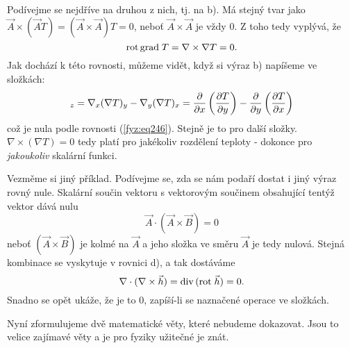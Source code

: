 {    Podívejme se nejdříve na druhou z nich, tj. na b). Má stejný tvar jako 
    $\vec{A}\times(\vec{A}T)= (\vec{A}\times\vec{A})T = 0$, neboť $\vec{A}\times\vec{A}$ je 
    vždy \(0\). Z toho tedy vyplývá, že
    \begin{equation}\label{fyz:eq239}
      \mathrm{rot}\,\mathrm{grad\;}T = \nabla\times\nabla T = 0.
    \end{equation}
    Jak dochází k této rovnosti, můžeme vidět, když si výraz b) napíšeme ve složkách: 
    \begin{equation*}
      [\nabla\times(\nabla T)]_z = \nabla_x(\nabla T)_y-\nabla_y(\nabla T)_x =
       \pder{}{x}\left(\pder{T}{y}\right) - \pder{}{y}\left(\pder{T}{x}\right)
    \end{equation*}
    což je nula podle rovnosti (\ref{fyz:eq246}). Stejně je to pro další složky.
    \(\nabla\times(\nabla T)=0\) tedy platí pro jakékoliv rozdělení teploty - dokonce pro 
    \emph{jakoukoliv} skalární funkci.
  
    Vezměme si jiný příklad. Podívejme se, zda se nám podaří dostat i jiný výraz rovný nule. 
    Skalární součin vektoru s vektorovým součinem obsahující tentýž vektor dává nulu
    \begin{equation*}
      \vec{A}\cdot(\vec{A}\times\vec{B}) = 0
    \end{equation*}
    neboť \((\vec{A}\times\vec{B})\) je kolmé na \(\vec{A}\) a jeho složka ve směru \(\vec{A}\) je 
    tedy nulová. Stejná kombinace se vyskytuje v rovnici d), a tak dostáváme
    \begin{equation}\label{fyz:eq240}
      \nabla\cdot(\nabla\times\vec{h}) = \mathrm{div}\,(\mathrm{rot}\;\vec{h})= 0.
    \end{equation}
    Snadno se opět ukáže, že je to \(0\), zapíší-li se naznačené operace ve složkách.
  
    Nyní zformulujeme dvě matematické věty, které nebudeme dokazovat. Jsou to velice zajímavé věty 
    a je pro fyziky užitečné je znát. 
  
}
